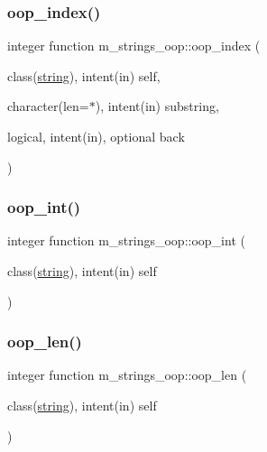 \mbox{\label{namespacem__strings__oop_aafe02b26ccba21eb8a35e9fa99d6c790}} 
\subsubsection{\texorpdfstring{oop\+\_\+index()}{oop\_index()}}
{\footnotesize\ttfamily integer function m\+\_\+strings\+\_\+oop\+::oop\+\_\+index (\begin{DoxyParamCaption}\item[{class(\mbox{\hyperlink{structm__strings__oop_1_1string}{string}}), intent(in)}]{self,  }\item[{character(len=$\ast$), intent(in)}]{substring,  }\item[{logical, intent(in), optional}]{back }\end{DoxyParamCaption})\hspace{0.3cm}{\ttfamily [private]}}

\mbox{\label{namespacem__strings__oop_a2092266bec4014f74b8d436c5a8e319f}} 
\subsubsection{\texorpdfstring{oop\+\_\+int()}{oop\_int()}}
{\footnotesize\ttfamily integer function m\+\_\+strings\+\_\+oop\+::oop\+\_\+int (\begin{DoxyParamCaption}\item[{class(\mbox{\hyperlink{structm__strings__oop_1_1string}{string}}), intent(in)}]{self }\end{DoxyParamCaption})\hspace{0.3cm}{\ttfamily [private]}}

\mbox{\label{namespacem__strings__oop_a768ea13372aadbeae760c72d0b2a1939}} 
\subsubsection{\texorpdfstring{oop\+\_\+len()}{oop\_len()}}
{\footnotesize\ttfamily integer function m\+\_\+strings\+\_\+oop\+::oop\+\_\+len (\begin{DoxyParamCaption}\item[{class(\mbox{\hyperlink{structm__strings__oop_1_1string}{string}}), intent(in)}]{self }\end{DoxyParamCaption})\hspace{0.3cm}{\ttfamily [private]}}

